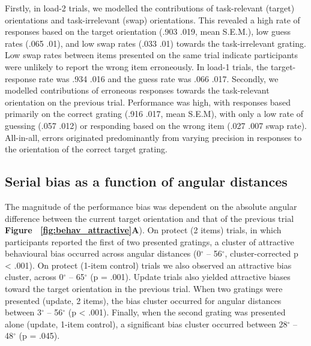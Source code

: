 \documentclass{article}
\begin{document}
Firstly, in load-2 trials, we modelled the contributions of task-relevant (target) orientations and task-irrelevant (swap) orientations. This revealed a high rate of responses based on the target orientation (.903 \textpm .019, mean \textpm S.E.M.), low guess rates (.065 \textpm .01), and low swap rates (.033 \textpm .01) towards the task-irrelevant grating. Low swap rates between items presented on the same trial indicate participants were unlikely to report the wrong item erroneously. In load-1 trials, the target-response rate was .934 \textpm .016 and the guess rate was .066 \textpm .017. Secondly, we modelled contributions of erroneous responses towards the task-relevant orientation on the previous trial. Performance was high, with responses based primarily on the correct grating (.916 \textpm .017, mean \textpm S.E.M), with only a low rate of guessing (.057 \textpm .012) or responding based on the wrong item (.027 \textpm .007 swap rate). All-in-all, errors originated predominantly from varying precision in responses to the orientation of the correct target grating.

\subsection*{Serial bias as a function of angular distances}
The magnitude of the performance bias was dependent on the absolute angular difference between the current target orientation and that of the previous trial \textbf{Figure ~\ref{fig:behav_attractive}A}). On protect (2 items) trials, in which participants reported the first of two presented gratings, a cluster of attractive behavioural bias occurred across angular distances (0$^{\circ}$ – 56$^{\circ}$, cluster-corrected p < .001). On protect (1-item control) trials we also observed an attractive bias cluster, across 0$^{\circ}$ – 65$^{\circ}$ (p = .001).  Update trials also yielded attractive biases toward the target orientation in the previous trial. When two gratings were presented (update, 2 items), the bias cluster occurred for angular distances between 3$^{\circ}$ – 56$^{\circ}$ (p < .001). Finally, when the second grating was presented alone (update, 1-item control), a significant bias cluster occurred between 28$^{\circ}$ – 48$^{\circ}$ (p = .045).
\end{document}
